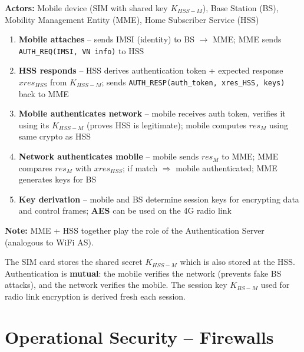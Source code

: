 \begin{tcolorbox}[keybox, title=4G LTE Authentication -- 5 Steps]
\textbf{Actors:} Mobile device (SIM with shared key $K_{HSS-M}$), Base Station (BS), Mobility Management Entity (MME), Home Subscriber Service (HSS)\\[6pt]
\begin{enumerate}[noitemsep]
  \item[\textbf{a}] \textbf{Mobile attaches} -- sends IMSI (identity) to BS $\to$ MME; MME sends \texttt{AUTH\_REQ(IMSI, VN info)} to HSS
  \item[\textbf{b}] \textbf{HSS responds} -- HSS derives authentication token + expected response $xres_{HSS}$ from $K_{HSS-M}$; sends \texttt{AUTH\_RESP(auth\_token, xres\_{HSS}, keys)} back to MME
  \item[\textbf{c}] \textbf{Mobile authenticates network} -- mobile receives auth token, verifies it using its $K_{HSS-M}$ (proves HSS is legitimate); mobile computes $res_M$ using same crypto as HSS
  \item[\textbf{d}] \textbf{Network authenticates mobile} -- mobile sends $res_M$ to MME; MME compares $res_M$ with $xres_{HSS}$; if match $\Rightarrow$ mobile authenticated; MME generates keys for BS
  \item[\textbf{e}] \textbf{Key derivation} -- mobile and BS determine session keys for encrypting data and control frames; \textbf{AES} can be used on the 4G radio link
\end{enumerate}
\textbf{Note:} MME + HSS together play the role of the Authentication Server (analogous to WiFi AS).
\end{tcolorbox}

\begin{tcolorbox}[warnbox, title=4G LTE Key Insight]
The SIM card stores the shared secret $K_{HSS-M}$ which is also stored at the HSS. Authentication is \textbf{mutual}: the mobile verifies the network (prevents fake BS attacks), and the network verifies the mobile. The session key $K_{BS-M}$ used for radio link encryption is derived fresh each session.
\end{tcolorbox}

\section{Operational Security -- Firewalls}

